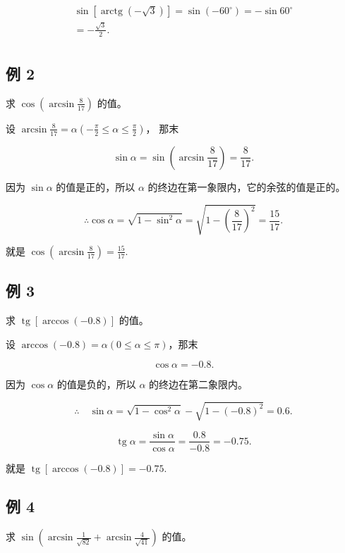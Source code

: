 \[
\begin{array}{l} \sin [ \operatorname{arctg} (- \sqrt {3}) ] = \sin (- 60 ^{\circ}) = - \sin 60 ^{\circ} \\ = - \frac {\sqrt {3}}{2}. \\ \end{array}
\]

\subsection{例 2}

求 \(\cos \left(\arcsin \frac{8}{17}\right)\) 的值。

 设
\(\arcsin \frac{8}{17} = \alpha \left(-\frac{\pi}{2} \leqslant \alpha \leqslant \frac{\pi}{2}\right)\)，
那末

\[
\sin \alpha = \sin \left(\arcsin \frac {8}{17}\right) = \frac {8}{17}.
\]

因为 \(\sin \alpha\) 的值是正的，所以 \(\alpha\)
的终边在第一象限内，它的余弦的值是正的。

\[
\therefore \cos \alpha = \sqrt {1 - \sin^ {2} \alpha} = \sqrt {1 - \left(\frac {8}{17}\right) ^ {2}} = \frac {15}{17}.
\]

就是 \(\cos \left(\arcsin \frac{8}{17}\right) = \frac{15}{17}.\)

\subsection{例 3}

求 \(\operatorname{tg}[\arccos (-0.8)]\) 的值。

 设
\(\arccos (-0.8) = \alpha (0\leqslant \alpha \leqslant \pi)\)，那末

\[
\cos \alpha = - 0.8.
\]

因为 \(\cos \alpha\) 的值是负的，所以 \(\alpha\) 的终边在第二象限内。

\[
\therefore \quad \sin \alpha = \sqrt {1 - \cos^ {2} \alpha} - \sqrt {1 - (- 0.8) ^ {2}} = 0.6.
\]

\[
\operatorname{tg} \alpha = \frac {\sin \alpha}{\cos \alpha} = \frac {0.8}{- 0.8} = - 0.75.
\]

就是 \(\operatorname{tg}[\arccos (-0.8)] = -0.75.\)

\subsection{例 4}

求
\(\sin \left(\arcsin \frac{1}{\sqrt{82}} + \arcsin \frac{4}{\sqrt{41}}\right)\)
的值。

